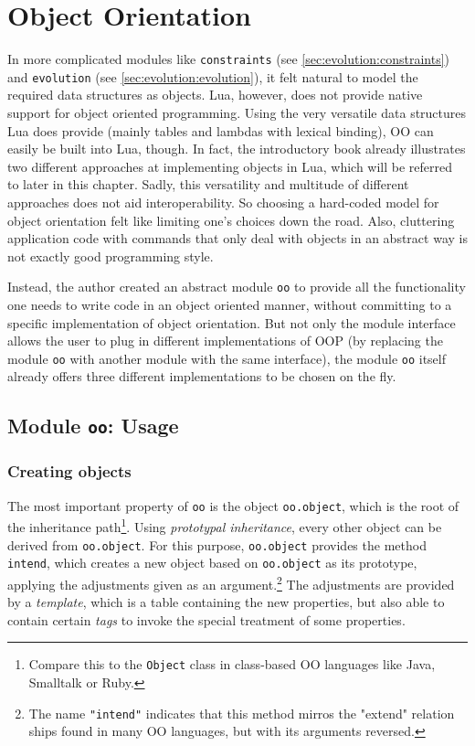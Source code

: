 \chapter{Object Orientation}
\label{oo}
\label{chap:oo}

In more complicated modules like \texttt{constraints} (see \ref{sec:evolution:constraints}) and \texttt{evolution} (see \ref{sec:evolution:evolution}), it felt natural to model the required data structures as objects. Lua, however, does not provide native support for object oriented programming. Using the very versatile data structures Lua does provide (mainly tables and lambdas with lexical binding), OO can easily be built into Lua, though. In fact, the introductory book \cite{Ierusalimschy2006} already illustrates two different approaches at implementing objects in Lua, which will be referred to later in this chapter. Sadly, this versatility and multitude of different approaches does not aid interoperability. So choosing a hard-coded model for object orientation felt like limiting one's choices down the road. Also, cluttering application code with commands that only deal with objects in an abstract way is not exactly good programming style.

Instead, the author created an abstract module \texttt{oo} to provide all the functionality one needs to write code in an object oriented manner, without committing to a specific implementation of object orientation. But not only the module interface allows the user to plug in different implementations of OOP (by replacing the module \texttt{oo} with another module with the same interface), the module \texttt{oo} itself already offers three different implementations to be chosen on the fly.

\section{Module \texttt{oo}: Usage}

\subsection{Creating objects}

The most important property of \texttt{oo} is the object \texttt{oo.object}, which is the root of the inheritance path\footnote{Compare this to the \texttt{Object} class in class-based OO languages like Java, Smalltalk or Ruby.}. Using \emph{prototypal inheritance}, every other object can be derived from \texttt{oo.object}. For this purpose, \texttt{oo.object} provides the method \texttt{intend}, which creates a new object based on \texttt{oo.object} as its prototype, applying the adjustments given as an argument.\footnote{The name \texttt{"intend"} indicates that this method mirros the "extend" relation ships found in many OO languages, but with its arguments reversed.} The adjustments are provided by a \emph{template}, which is a table containing the new properties, but also able to contain certain \emph{tags} to invoke the special treatment of some properties.

